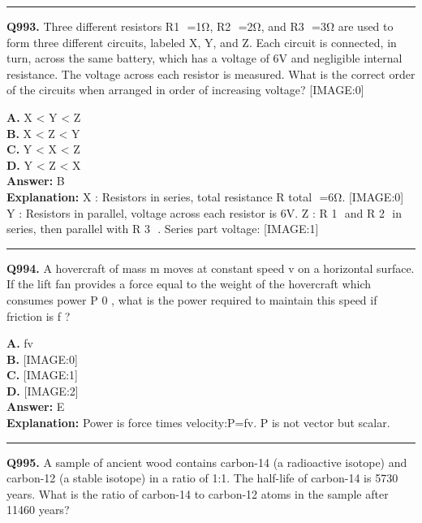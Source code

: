 \documentclass[12pt]{article}
\begin{document}
\hrule
\vspace{1em}


\noindent
\textbf{Q993.} Three different resistors R1
​
=1Ω, R2
​
=2Ω, and R3
​
=3Ω are used to form three different circuits, labeled X, Y, and Z. Each circuit is connected, in turn, across the same battery, which has a voltage of 6V and negligible internal resistance. The voltage across each resistor is measured. What is the correct order of the circuits when arranged in order of increasing voltage?
[IMAGE:0]



\textbf{A.} X < Y < Z \\
\textbf{B.} X < Z < Y \\
\textbf{C.} Y < X < Z \\
\textbf{D.} Y < Z < X \\

\textbf{Answer:} B \\
\textbf{Explanation:} X
: Resistors in series, total resistance
R
total
​
=6Ω.
[IMAGE:0]
Y
: Resistors in parallel, voltage across each resistor is 6V.
Z
:
R
1
​
and
R
2
​
in series, then parallel with
R
3
​
.
Series part voltage:
[IMAGE:1]

\hrule
\vspace{1em}


\noindent
\textbf{Q994.} A hovercraft of mass
m
moves at constant speed
v
on a horizontal surface. If the lift fan provides a force equal to the weight of the hovercraft which consumes power
P
0
, what is the power required to maintain this speed if friction is
f
?



\textbf{A.} fv \\
\textbf{B.} [IMAGE:0] \\
\textbf{C.} [IMAGE:1] \\
\textbf{D.} [IMAGE:2] \\

\textbf{Answer:} E \\
\textbf{Explanation:} Power is force times velocity:P=fv.
P is not vector but scalar.

\hrule
\vspace{1em}


\noindent
\textbf{Q995.} A sample of ancient wood contains carbon-14 (a radioactive isotope) and carbon-12 (a stable isotope) in a ratio of 1:1. The half-life of carbon-14 is 5730 years. What is the ratio of carbon-14 to carbon-12 atoms in the sample after 11460 years?
\end{document}
